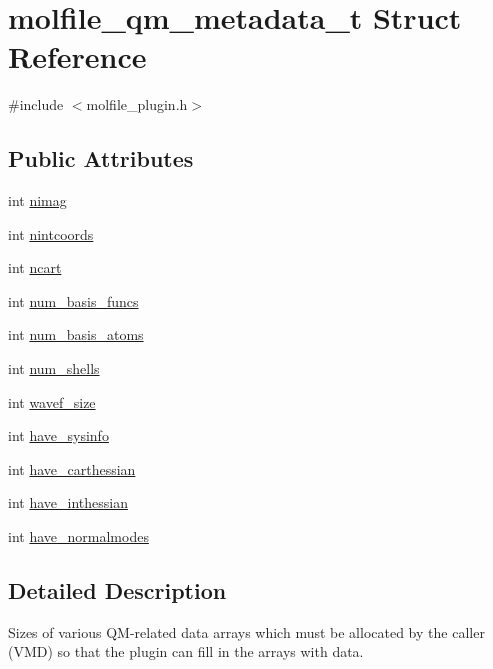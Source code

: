 \hypertarget{structmolfile__qm__metadata__t}{\section{molfile\-\_\-qm\-\_\-metadata\-\_\-t \-Struct \-Reference}
\label{structmolfile__qm__metadata__t}
}


{\ttfamily \#include $<$molfile\-\_\-plugin.\-h$>$}

\subsection*{\-Public \-Attributes}
\begin{DoxyCompactItemize}
\item 
int \hyperlink{structmolfile__qm__metadata__t_ad1d0e3955c761fcc52212d22f5e99f8d}{nimag}
\item 
int \hyperlink{structmolfile__qm__metadata__t_a78dac998b9cdce2dc5cfc52aa7ca724c}{nintcoords}
\item 
int \hyperlink{structmolfile__qm__metadata__t_a2e07911c0925c8203d13d776b29cf68d}{ncart}
\item 
int \hyperlink{structmolfile__qm__metadata__t_a38c4cd364a0fd01238688f31acb1ba51}{num\-\_\-basis\-\_\-funcs}
\item 
int \hyperlink{structmolfile__qm__metadata__t_a5affe7a323cb231bfe66395d238d0759}{num\-\_\-basis\-\_\-atoms}
\item 
int \hyperlink{structmolfile__qm__metadata__t_ad8142f87b3b9459b1a5d43b1132b4525}{num\-\_\-shells}
\item 
int \hyperlink{structmolfile__qm__metadata__t_a0e0ec769ad0c30a9e6360ba57322279b}{wavef\-\_\-size}
\item 
int \hyperlink{structmolfile__qm__metadata__t_a375fd311a7a873cb35a6d885a2467b41}{have\-\_\-sysinfo}
\item 
int \hyperlink{structmolfile__qm__metadata__t_afe95e4ff9a634e0dd0331b74e6f764a1}{have\-\_\-carthessian}
\item 
int \hyperlink{structmolfile__qm__metadata__t_a5dc0455066f4919cbc87e482518cd517}{have\-\_\-inthessian}
\item 
int \hyperlink{structmolfile__qm__metadata__t_acb40de5af1f93f949cbf3b6b0448f2e1}{have\-\_\-normalmodes}
\end{DoxyCompactItemize}


\subsection{\-Detailed \-Description}
\-Sizes of various \-Q\-M-\/related data arrays which must be allocated by the caller (\-V\-M\-D) so that the plugin can fill in the arrays with data. 

